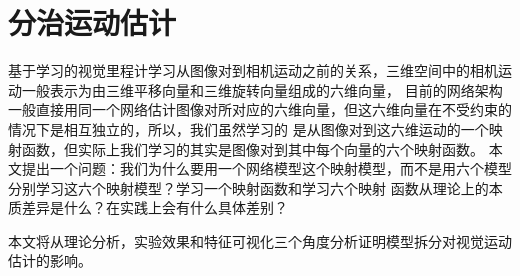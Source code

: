 \chapter{分治运动估计}
基于学习的视觉里程计学习从图像对到相机运动之前的关系，三维空间中的相机运动一般表示为由三维平移向量和三维旋转向量组成的六维向量，
目前的网络架构一般直接用同一个网络估计图像对所对应的六维向量，但这六维向量在不受约束的情况下是相互独立的，所以，我们虽然学习的
是从图像对到这六维运动的一个映射函数，但实际上我们学习的其实是图像对到其中每个向量的六个映射函数。
本文提出一个问题：我们为什么要用一个网络模型这个映射模型，而不是用六个模型分别学习这六个映射模型？学习一个映射函数和学习六个映射
函数从理论上的本质差异是什么？在实践上会有什么具体差别？

本文将从理论分析，实验效果和特征可视化三个角度分析证明模型拆分对视觉运动估计的影响。